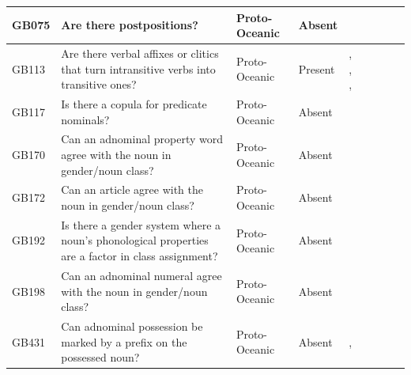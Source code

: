 \documentclass[draft,10pt]{article} %
\begin{document}
\begin{landscape}
\begin{longtable}{| p{2cm}| p{3cm}| p{2.5cm}|p{2cm}|p{2cm}|p{2cm}|p{2cm}|p{2cm}|p{2cm}|}
GB075&Are there postpositions?&Proto-Oceanic&Absent&\citet[500]{ross2004morphosyntactic}& \cellcolor{hedvig_lightgreen!50}{True Negative} & \cellcolor{hedvig_yellow!50}{Half} & \cellcolor{hedvig_yellow!50}{True Negative} & \cellcolor{hedvig_yellow!50}{Half} \\ \hline
GB113&Are there verbal affixes or clitics that turn intransitive verbs into transitive ones?&Proto-Oceanic&Present&\citet[171]{pawley1973some}, \citet[123]{wilson1982proto}, \citet[80, 92]{lynchrosscrowley_proto_grammar_oceanic}, \citet[112]{evans2003study}& \cellcolor{hedvig_lightgreen!50}{True Positive} & \cellcolor{hedvig_yellow!50}{Half} & \cellcolor{hedvig_lightgreen!50}{True Positive} & \cellcolor{hedvig_yellow!50}{Half} \\ \hline
GB117&Is there a copula for predicate nominals?&Proto-Oceanic&Absent&\citet[86]{lynchrosscrowley_proto_grammar_oceanic}& \cellcolor{hedvig_lightgreen!50}{True Negative} & \cellcolor{hedvig_yellow!50}{Half} & \cellcolor{hedvig_yellow!50}{True Negative} & \cellcolor{hedvig_yellow!50}{Half} \\ \hline
GB170&Can an adnominal property word agree with the noun in gender/noun class?&Proto-Oceanic&Absent&\citet[498]{ross2004morphosyntactic}& \cellcolor{hedvig_lightgreen!50}{True Negative} & \cellcolor{hedvig_yellow!50}{Half} & \cellcolor{hedvig_yellow!50}{True Negative} & \cellcolor{hedvig_yellow!50}{Half} \\ \hline
GB172&Can an article agree with the noun in gender/noun class?&Proto-Oceanic&Absent&\citet[498]{ross2004morphosyntactic}& \cellcolor{hedvig_lightgreen!50}{True Negative} & \cellcolor{hedvig_yellow!50}{Half} & \cellcolor{hedvig_yellow!50}{True Negative} & \cellcolor{hedvig_yellow!50}{Half} \\ \hline
GB192&Is there a gender system where a noun's phonological properties are a factor in class assignment?&Proto-Oceanic&Absent&\citet[498]{ross2004morphosyntactic}& \cellcolor{hedvig_lightgreen!50}{True Negative} & \cellcolor{hedvig_yellow!50}{Half} & \cellcolor{hedvig_yellow!50}{True Negative} & \cellcolor{hedvig_red!50}{False Positive} \\ \hline
GB198&Can an adnominal numeral agree with the noun in gender/noun class?&Proto-Oceanic&Absent&\citet[498]{ross2004morphosyntactic}& \cellcolor{hedvig_lightgreen!50}{True Negative} & \cellcolor{hedvig_yellow!50}{Half} & \cellcolor{hedvig_yellow!50}{True Negative} & \cellcolor{hedvig_yellow!50}{Half} \\ \hline
GB431&Can adnominal possession be marked by a prefix on the possessed noun?&Proto-Oceanic&Absent&\citet[117]{pawley1973some}, \citet[494, 497]{ross2004morphosyntactic}& \cellcolor{hedvig_lightgreen!50}{True Negative} & \cellcolor{hedvig_yellow!50}{Half} & \cellcolor{hedvig_yellow!50}{True Negative} & \cellcolor{hedvig_yellow!50}{Half} \\ \hline

\end{longtable}
\end{landscape}
\end{document}
